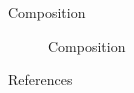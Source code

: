 \documentclass[10pt]{beamer}
\begin{document}
\begin{frame}{Composition}
	\begin{figure}[!h]
		\caption{\label{fig:composition} Composition}
	\end{figure}
\end{frame}
	


\begin{frame}[allowframebreaks]{References}

  
  

\end{frame}
\end{document}
